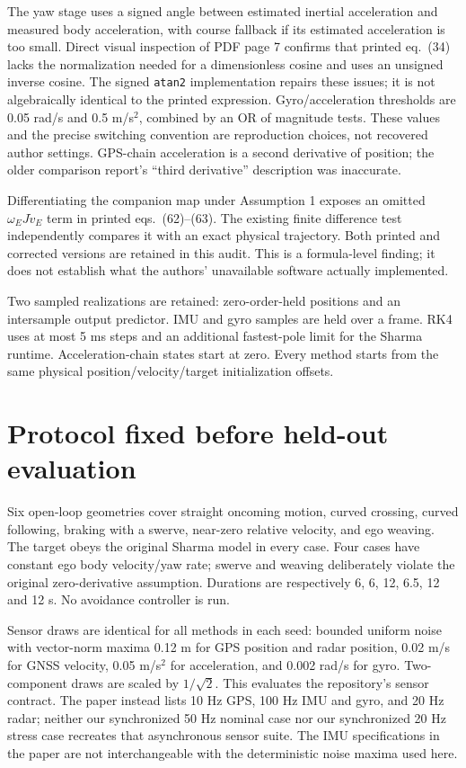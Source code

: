\documentclass[11pt]{article}
\begin{document}
The yaw stage uses a signed angle between estimated inertial acceleration
and measured body acceleration, with course fallback if its estimated
acceleration is too small. Direct visual inspection of PDF page 7 confirms
that printed eq.~(34) lacks the normalization needed for a dimensionless
cosine and uses an unsigned inverse cosine. The signed \texttt{atan2}
implementation repairs these issues; it is not algebraically identical to
the printed expression. Gyro/acceleration thresholds are 0.05 rad/s and
0.5 m/s$^2$, combined by an OR of magnitude tests. These values and the
precise switching convention are reproduction choices, not recovered author
settings. GPS-chain acceleration is a second derivative of position; the
older comparison report's ``third derivative'' description was inaccurate.

Differentiating the companion map under Assumption 1 exposes an omitted
$\omega_EJ\dot v_E$ term in printed eqs.~(62)--(63). The existing finite
difference test independently compares it with an exact physical trajectory.
Both printed and corrected versions are retained in this audit. This is a
formula-level finding; it does not establish what the authors' unavailable
software actually implemented.

Two sampled realizations are retained: zero-order-held positions and an
intersample output predictor. IMU and gyro samples are held over a frame.
RK4 uses at most 5 ms steps and an additional fastest-pole limit for the
Sharma runtime. Acceleration-chain states start at zero. Every method starts
from the same physical position/velocity/target initialization offsets.

\section{Protocol fixed before held-out evaluation}
Six open-loop geometries cover straight oncoming motion, curved crossing,
curved following, braking with a swerve, near-zero relative velocity, and
ego weaving. The target obeys the original Sharma model in every case.
Four cases have constant ego body velocity/yaw rate; swerve and weaving
deliberately violate the original zero-derivative assumption. Durations
are respectively 6, 6, 12, 6.5, 12 and 12 s. No avoidance controller is run.

Sensor draws are identical for all methods in each seed: bounded uniform
noise with vector-norm maxima 0.12 m for GPS position and radar position,
0.02 m/s for GNSS velocity, 0.05 m/s$^2$ for acceleration, and 0.002 rad/s
for gyro. Two-component draws are scaled by $1/\sqrt2$. This evaluates the
repository's sensor contract. The paper instead lists 10 Hz GPS, 100 Hz IMU
and gyro, and 20 Hz radar; neither our synchronized 50 Hz nominal case nor
our synchronized 20 Hz stress case recreates that asynchronous sensor suite.
The IMU specifications in the paper are not interchangeable with the
deterministic noise maxima used here.
\end{document}
